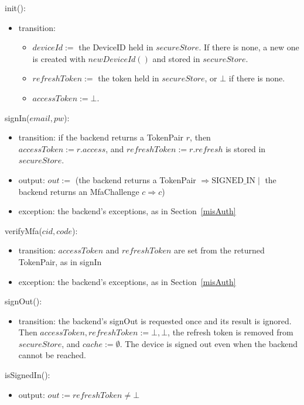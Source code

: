 \documentclass[12pt, titlepage]{article}
\begin{document}
\noindent init():
\begin{itemize}
\item transition:
  \begin{itemize}
  \item $\mathit{deviceId} :=$ the DeviceID held in $\mathit{secureStore}$.
    If there is none, a new one is created with $\mathit{newDeviceId}()$ and
    stored in $\mathit{secureStore}$.
  \item $\mathit{refreshToken} :=$ the token held in $\mathit{secureStore}$,
    or $\bot$ if there is none.
  \item $\mathit{accessToken} := \bot$.
  \end{itemize}
\end{itemize}

\noindent signIn($\mathit{email}, \mathit{pw}$):
\begin{itemize}
\item transition: if the backend returns a TokenPair $r$, then
  $\mathit{accessToken} := r.\mathit{access}$, and $\mathit{refreshToken}
  := r.\mathit{refresh}$ is stored in $\mathit{secureStore}$.
\item output: $\mathit{out} :=$ (the backend returns a TokenPair
  $\Rightarrow \mathrm{SIGNED\_IN} \mid$ the backend returns an MfaChallenge
  $c \Rightarrow c$)
\item exception: the backend's exceptions, as in Section~\ref{misAuth}
\end{itemize}

\noindent verifyMfa($\mathit{cid}, \mathit{code}$):
\begin{itemize}
\item transition: $\mathit{accessToken}$ and $\mathit{refreshToken}$ are
  set from the returned TokenPair, as in signIn
\item exception: the backend's exceptions, as in Section~\ref{misAuth}
\end{itemize}

\noindent signOut():
\begin{itemize}
\item transition: the backend's signOut is requested once and its result is
  ignored. Then $\mathit{accessToken}, \mathit{refreshToken} := \bot, \bot$,
  the refresh token is removed from $\mathit{secureStore}$, and
  $\mathit{cache} := \emptyset$. The device is signed out even when the
  backend cannot be reached.
\end{itemize}

\noindent isSignedIn():
\begin{itemize}
\item output: $\mathit{out} := \mathit{refreshToken} \neq \bot$
\end{itemize}
\end{document}
